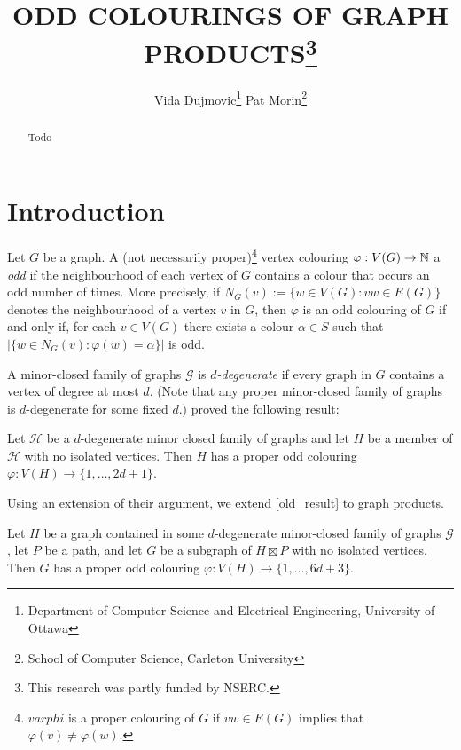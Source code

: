 \documentclass{patmorin}
\title{\MakeUppercase{Odd Colourings of Graph Products}\thanks{This research was partly funded by NSERC.}}
\author{%
  Vida Dujmovic\thanks{Department of Computer Science and Electrical Engineering, University of Ottawa}\qquad
  Pat Morin\thanks{School of Computer Science, Carleton University}
}
\date{}
\begin{document}
\maketitle

\begin{abstract}
  Todo
\end{abstract}

%

\section{Introduction}

Let $G$ be a graph.  A (not necessarily proper)\footnote{$varphi$ is a proper colouring of $G$ if $vw\in E(G)$ implies that $\varphi(v)\neq\varphi(w)$.} vertex colouring $\varphi:V(G)\to\mathbb{N}$ a \emph{odd} if the neighbourhood of each vertex of $G$ contains a colour that occurs an odd number of times.  More precisely, if $N_G(v):=\{w\in V(G):vw\in E(G)\}$ denotes the neighbourhood of a vertex $v$ in $G$, then $\varphi$ is an odd colouring of $G$ if and only if, for each $v\in V(G)$ there exists a colour $\alpha\in S$ such that $|\{w\in N_G(v): \varphi(w)=\alpha\}|$ is odd.

A minor-closed family of graphs $\mathcal{G}$ is \emph{$d$-degenerate} if every graph in $G$ contains a vertex of degree at most $d$.  (Note that any proper minor-closed family of graphs is $d$-degenerate for some fixed $d$.)  \citet{cranston.lafferty.ea:note} proved the following result:

\begin{thm}\label{old_result}
  Let $\mathcal{H}$ be a $d$-degenerate minor closed family of graphs and let $H$ be a member of $\mathcal{H}$ with no isolated vertices.  Then $H$ has a proper odd colouring $\varphi:V(H)\to\{1,\ldots,2d+1\}$.
\end{thm}

Using an extension of their argument, we extend \cref{old_result} to graph products.

\begin{thm}\label{new_result}
  Let $H$ be a graph contained in some $d$-degenerate minor-closed family of graphs $\mathcal{G}$, let $P$ be a path, and let $G$ be a subgraph of $H\boxtimes P$ with no isolated vertices. Then $G$ has a proper odd colouring $\varphi:V(H)\to\{1,\ldots,6d+3\}$.
\end{thm}
\end{document}
